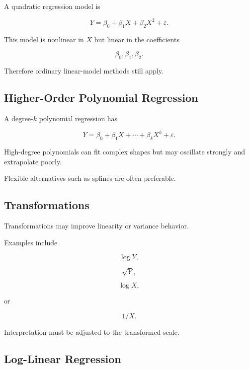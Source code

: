 A quadratic regression model is

\[
\boxed{
Y
=
\beta_0
+
\beta_1X
+
\beta_2X^2
+
\varepsilon.
}
\]

This model is nonlinear in \(X\) but linear in the coefficients

\[
\beta_0,\beta_1,\beta_2.
\]

Therefore ordinary linear-model methods still apply.

\subsection{Higher-Order Polynomial Regression}
\label{subsec:higher-order-polynomial-regression}

A degree-\(k\) polynomial regression has

\[
\boxed{
Y
=
\beta_0
+
\beta_1X
+
\cdots
+
\beta_kX^k
+
\varepsilon.
}
\]

High-degree polynomials can fit complex shapes but may oscillate
strongly and extrapolate poorly.

Flexible alternatives such as splines are often preferable.

\subsection{Transformations}
\label{subsec:regression-transformations}

Transformations may improve linearity or variance behavior.

Examples include

\[
\boxed{
\log Y,
}
\]

\[
\boxed{
\sqrt{Y},
}
\]

\[
\boxed{
\log X,
}
\]

or

\[
\boxed{
1/X.
}
\]

Interpretation must be adjusted to the transformed scale.

\subsection{Log-Linear Regression}
\label{subsec:log-linear-regression}

